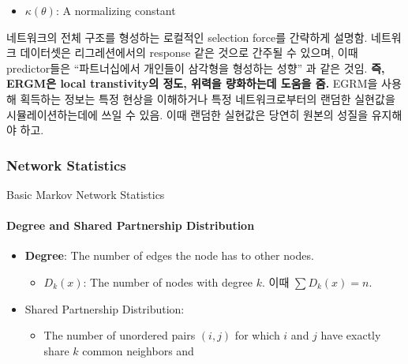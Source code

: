\documentclass[
]{book}
\providecommand{\tightlist}{%
  \setlength{\itemsep}{0pt}\setlength{\parskip}{0pt}}
\begin{document}
{{{\begin{itemize}
  \begin{itemize}
  \tightlist
  \item
    \(\theta >0\): There exists a tendency to form \(g(x)\) when changing \(X_{ij}\) value from 0 to 1.
  \item
    \(\theta >0\): There exists a tendency \textbf{not} to form \(g(x)\) when changing \(X_{ij}\) value from 0 to 1.
  \end{itemize}
\item
  \(\kappa (θ)\): A normalizing constant
\end{itemize}

네트워크의 전체 구조를 형성하는 로컬적인 selection force를 간략하게 설명함. 네트워크 데이터셋은 리그레션에서의 response 같은 것으로 간주될 수 있으며, 이때 predictor들은 ``파트너십에서 개인들이 삼각형을 형성하는 성향'' 과 같은 것임. \textbf{즉, ERGM은 local transtivity의 정도, 위력을 량화하는데 도움을 줌.} EGRM을 사용해 획득하는 정보는 특정 현상을 이해하거나 특정 네트워크로부터의 랜덤한 실현값을 시뮬레이션하는데에 쓰일 수 있음. 이때 랜덤한 실현값은 당연히 원본의 성질을 유지해야 하고.

\hypertarget{network-statistics}{%
\subsubsection{Network Statistics}\label{network-statistics}}

Basic Markov Network Statistics

\hypertarget{degree-and-shared-partnership-distribution}{%
\paragraph{Degree and Shared Partnership Distribution}\label{degree-and-shared-partnership-distribution}}

\begin{itemize}
\tightlist
\item
  \textbf{Degree}: The number of edges the node has to other nodes.

  \begin{itemize}
  \tightlist
  \item
    \(D_k (x)\): The number of nodes with degree \(k\). 이때 \(\sum D_k(x) = n\).
  \end{itemize}
\item
  Shared Partnership Distribution:

  \begin{itemize}
  \tightlist
  \item
    The number of unordered pairs \((i, j)\) for which \(i\) and \(j\) have exactly share \(k\) common neighbors and


\end{itemize}
\end{itemize}}}}
\end{document}
